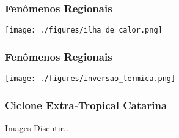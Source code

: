 \begin{frame}
\frametitle{Fenômenos Regionais}
  \begin{center}
    \texttt{[image: ./figures/ilha\_de\_calor.png]}
  \end{center}
\end{frame}

\begin{frame}
\frametitle{Fenômenos Regionais}
  \begin{center}
    \texttt{[image: ./figures/inversao\_termica.png]}
  \end{center}
\end{frame}

\begin{frame}
\frametitle{Ciclone Extra-Tropical Catarina}
  \begin{block}{Images}
    Discutir..
  \end{block}
\end{frame}


